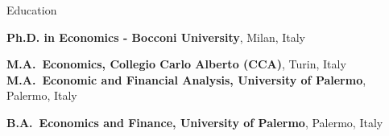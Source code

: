 \begin{rubric}{Education}

\entry*[2025 -- Current]%
	\textbf{Ph.D. in Economics - Bocconi University}, Milan, Italy 
%


\entry*[2023 -- 2024]%
	\textbf{M.A.~Economics, Collegio Carlo Alberto (CCA)}, Turin, Italy
%
\entry*[2020 -- 2022]%
	\textbf{M.A.~Economic and Financial Analysis, University of Palermo}, Palermo, Italy \par
	



% 
\entry*[2015 -- 2020]%
	\textbf{B.A.~Economics and Finance, University of Palermo}, Palermo, Italy\par
	
\end{rubric}